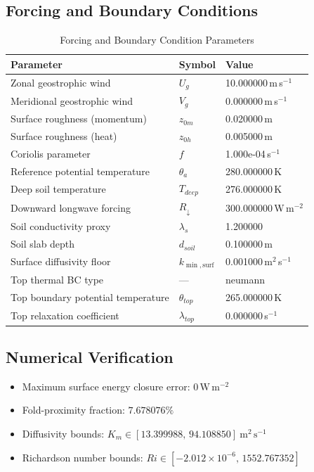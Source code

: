 \subsection{Forcing and Boundary Conditions}
\begin{table}[htbp]
\centering
\caption{Forcing and Boundary Condition Parameters}
\label{tab:scm_parameters_floss_floss_80x2m_9h_report}
\begin{tabular}{lll}
\hline
{\bfseries Parameter} & {\bfseries Symbol} & {\bfseries Value} \\
\hline
Zonal geostrophic wind & $U_g$ & 10.000000\,m\,s$^{-1}$ \\
Meridional geostrophic wind & $V_g$ & 0.000000\,m\,s$^{-1}$ \\
Surface roughness (momentum) & $z_{0m}$ & 0.020000\,m \\
Surface roughness (heat) & $z_{0h}$ & 0.005000\,m \\
Coriolis parameter & $f$ & 1.000e-04\,s$^{-1}$ \\
Reference potential temperature & $\theta_a$ & 280.000000\,K \\
Deep soil temperature & $T_{deep}$ & 276.000000\,K \\
Downward longwave forcing & $R_{\downarrow}$ & 300.000000\,W\,m$^{-2}$ \\
Soil conductivity proxy & $\lambda_s$ & 1.200000 \\
Soil slab depth & $d_{soil}$ & 0.100000\,m \\
Surface diffusivity floor & $k_{\min,\mathrm{surf}}$ & 0.001000\,m$^2$\,s$^{-1}$ \\
Top thermal BC type & --- & neumann \\
Top boundary potential temperature & $\theta_{top}$ & 265.000000\,K \\
Top relaxation coefficient & $\lambda_{top}$ & 0.000000\,s$^{-1}$ \\
\hline
\end{tabular}
\end{table}

\subsection{Numerical Verification}
\begin{itemize}
  \item Maximum surface energy closure error:
  $0\,\mathrm{W\,m^{-2}}$
  \item Fold-proximity fraction:
  $7.678076\%$
  \item Diffusivity bounds:
  $K_m \in [13.399988,\,94.108850]~\mathrm{m^2\,s^{-1}}$
  \item Richardson number bounds:
  $Ri \in [-2.012 \times 10^{-6},\,1552.767352]$
\end{itemize}

